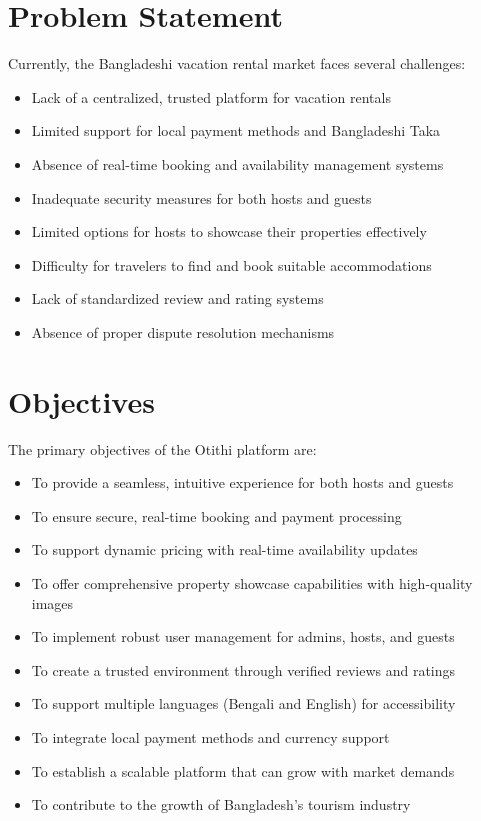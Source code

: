 \documentclass[12pt,a4paper]{report}
\begin{document}
\section{Problem Statement}
Currently, the Bangladeshi vacation rental market faces several challenges:

\begin{itemize}
    \item Lack of a centralized, trusted platform for vacation rentals
    \item Limited support for local payment methods and Bangladeshi Taka
    \item Absence of real-time booking and availability management systems
    \item Inadequate security measures for both hosts and guests
    \item Limited options for hosts to showcase their properties effectively
    \item Difficulty for travelers to find and book suitable accommodations
    \item Lack of standardized review and rating systems
    \item Absence of proper dispute resolution mechanisms
\end{itemize}

\section{Objectives}
The primary objectives of the Otithi platform are:

\begin{itemize}
    \item To provide a seamless, intuitive experience for both hosts and guests
    \item To ensure secure, real-time booking and payment processing
    \item To support dynamic pricing with real-time availability updates
    \item To offer comprehensive property showcase capabilities with high-quality images
    \item To implement robust user management for admins, hosts, and guests
    \item To create a trusted environment through verified reviews and ratings
    \item To support multiple languages (Bengali and English) for accessibility
    \item To integrate local payment methods and currency support
    \item To establish a scalable platform that can grow with market demands
    \item To contribute to the growth of Bangladesh's tourism industry
\end{itemize}
\end{document}
